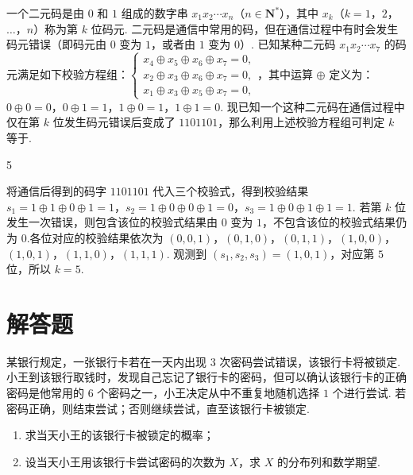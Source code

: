 \begin{problem}
一个二元码是由 \(0\) 和 \(1\) 组成的数字串 \(x_{1}x_{2}\cdots x_{n}\)（\(n\in \mathbf{N}^{*}\)），其中 \(x_{k}\)（\(k=1\)，\(2\)，\(\dots\)，\(n\)）称为第 \(k\) 位码元. 二元码是通信中常用的码，但在通信过程中有时会发生码元错误（即码元由 \(0\) 变为 \(1\)，或者由 \(1\) 变为 \(0\)）. 已知某种二元码 \(x_{1}x_{2}\cdots x_{7}\) 的码元满足如下校验方程组：\(\begin{cases}
x_{4}\oplus x_{5}\oplus x_{6}\oplus x_{7}=0,\\
x_{2}\oplus x_{3}\oplus x_{6}\oplus x_{7}=0,\\
x_{1}\oplus x_{3}\oplus x_{5}\oplus x_{7}=0,
\end{cases}\)，其中运算 \(\oplus\) 定义为：\(0\oplus 0=0\)，\(0\oplus 1=1\)，\(1\oplus 0=1\)，\(1\oplus 1=0\). 现已知一个这种二元码在通信过程中仅在第 \(k\) 位发生码元错误后变成了 \(1101101\)，那么利用上述校验方程组可判定 \(k\) 等于\fillinblank{}.
\end{problem}

\begin{answer}
5
\end{answer}

\begin{solution}
将通信后得到的码字 \(1101101\) 代入三个校验式，得到校验结果
\(s_1=1\oplus1\oplus0\oplus1=1\)，\(s_2=1\oplus0\oplus0\oplus1=0\)，\(s_3=1\oplus0\oplus1\oplus1=1\).
若第 \(k\) 位发生一次错误，则包含该位的校验式结果由 \(0\) 变为 \(1\)，不包含该位的校验式结果仍为 \(0\).各位对应的校验结果依次为
\((0,0,1)\)，\((0,1,0)\)，\((0,1,1)\)，\((1,0,0)\)，\((1,0,1)\)，\((1,1,0)\)，\((1,1,1)\).
观测到 \((s_1,s_2,s_3)=(1,0,1)\)，对应第 \(5\) 位，所以 \(k=5\).
\end{solution}

\section{解答题}

\begin{problem}
某银行规定，一张银行卡若在一天内出现 \(3\) 次密码尝试错误，该银行卡将被锁定. 小王到该银行取钱时，发现自己忘记了银行卡的密码，但可以确认该银行卡的正确密码是他常用的 \(6\) 个密码之一，小王决定从中不重复地随机选择 \(1\) 个进行尝试. 若密码正确，则结束尝试；否则继续尝试，直至该银行卡被锁定.
\begin{enumerate}
\item 求当天小王的该银行卡被锁定的概率；
\item 设当天小王用该银行卡尝试密码的次数为 \(X\)，求 \(X\) 的分布列和数学期望.
\end{enumerate}
\end{problem}

